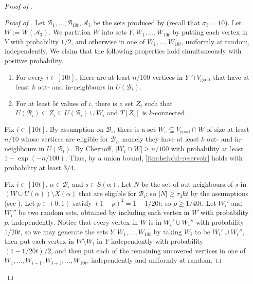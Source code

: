 \documentclass[english]{article}
\theoremstyle{plain}
\theoremstyle{remark}
\def\B{\mathcal{B}}
\def \Vg {V_{\good}}
\newcommand{\A}{\mathcal{A}}
\DeclareMathOperator{\good}{good}
\begin{document}
\begin{proof}[Proof of ]
		\begin{proof} [Proof of ]
			Let $\B_1, \ldots, \B_{10t}, \A_3$ be the sets produced by  (recall that $\sigma_3 = 10$).
			Let $W := W(\A_3)$. We partition $W$ into sets $Y, W_1, \ldots, W_{10t}$ by putting each vertex in $Y$ with probability $1/2$, and otherwise in one of $W_1, \ldots, W_{10t}$, uniformly at random, independently.
			We claim that the following properties hold simultaneously with positive probability.
			\begin{enumerate}[label = \rm(\alph*)]
				\item \label{itm:helpful-reservoir}
					For every $i \in [10t]$, there are at least $n / 100$ vertices in $Y \cap \Vg$ that have at least $k$ out- and in-neighbours in $U(\B_i)$.
				\item \label{itm:helpful-connected}
					For at least $5t$ values of $i$, there is a set $Z_i$ such that $U(\B_i) \subseteq Z_i \subseteq U(\B_i) \cup W_i$ and $T[Z_i]$ is $k$-connected.
			\end{enumerate}
			Fix $i \in [10t]$. By assumption on $\B_i$, there is a set $W_e \subseteq \Vg \cap W$ of size at least $n/10$ whose vertices are eligible for $\B_i$, namely they have at least $k$ out- and in-neighbours in $U(\B_i)$. By Chernoff, $|W_e \cap W| \ge n / 100$ with probability at least $1 - \exp(-n/100)$. Thus, by a union bound, \ref{itm:helpful-reservoir} holds with probability at least $3/4$.

			Fix $i \in [10t]$, $\alpha \in \B_i$ and $s \in S(\alpha)$. Let $N$ be the set of out-neighbours of $s$ in $(W \cup U(\alpha)) \setminus X(\alpha)$ that are eligible for $\B_i$; so $|N| \ge \tau_3 kt$ by the assumptions (see ).
			Let $p \in (0,1)$ satisfy $(1 - p)^2 = 1 - 1/20t$; so $p \ge 1/40t$. 
			Let $W_i'$ and $W_i''$ be two random sets, obtained by including each vertex in $W$ with probability $p$, independently. Notice that every vertex in $W$ is in $W_i' \cup W_i''$ with probability $1/20t$, so we may generate the sets $Y, W_1, \ldots, W_{10t}$ by taking $W_i$ to be $W_i' \cup W_i''$, then put each vertex in $W \setminus W_i$ in $Y$ independently with probability $(1 - 1/20t)/2$, and then put each of the remaining uncovered vertices in one of $W_1, \ldots, W_{i-1}, W_{i+1}, \ldots, W_{10t}$, independently and uniformly at random.


\end{proof}
\end{proof}
\end{document}
